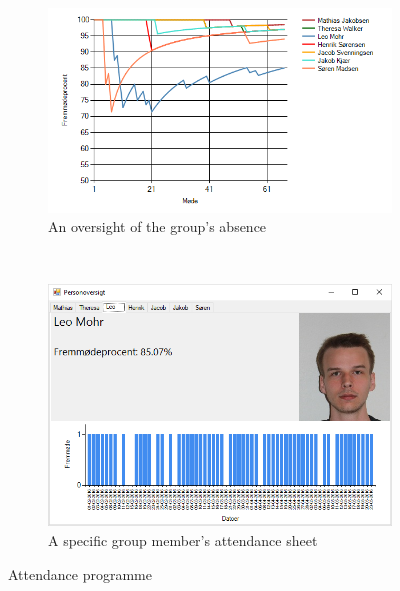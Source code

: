 \begin{figure}
    \centering
    \begin{subfigure}[b]{0.6\textwidth}
        \includegraphics[width=1\textwidth]{figures/GraphImage.png}
		\caption{An oversight of the group's absence}
		\label{fig:GraphImage}
    \end{subfigure}
    ~ %
    \begin{subfigure}[b]{0.35\textwidth}
        \includegraphics[width=1\textwidth]{figures/soerenfravaer.png}
		\caption{A specific group member's attendance sheet}
		\label{fig:soerenfravaer}
    \end{subfigure}
    \caption{Attendance programme}\label{fig:attendance}
\end{figure}



